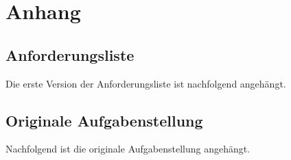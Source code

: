 \newpage
\section*{Anhang}

\subsection*{Anforderungsliste}

Die erste Version der Anforderungsliste ist nachfolgend angehängt.



\subsection*{Originale Aufgabenstellung}

Nachfolgend ist die originale Aufgabenstellung angehängt.


